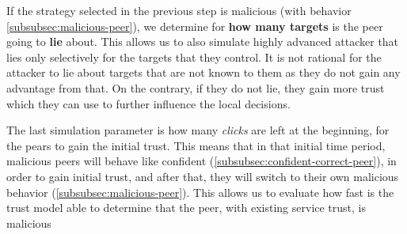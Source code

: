 If the strategy selected in the previous step is malicious (with behavior \ref{subsubsec:malicious-peer}), we determine for \textbf{how many targets} is the peer going to \textbf{lie} about.
This allows us to also simulate highly advanced attacker that lies only selectively for the targets that they control.
It is not rational for the attacker to lie about targets that are not known to them as they do not gain any advantage from that. On the contrary, if they do not lie, they gain more trust which they can use to further influence the local decisions. 

The last simulation parameter is how many \textit{clicks} are left at the beginning, for the pears to gain the initial trust.
This means that in that initial time period, malicious peers will behave like confident (\ref{subsubsec:confident-correct-peer}), in order to gain initial trust, and after that, they will switch to their own malicious behavior (\ref{subsubsec:malicious-peer}).
This allows us to evaluate how fast is the trust model able to determine that the peer, with existing service trust, is malicious